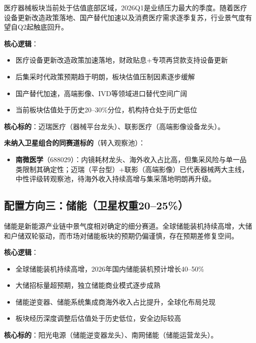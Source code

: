 医疗器械板块当前处于估值底部区域，2026Q1是业绩压力最大的季度。随着医疗设备更新改造政策落地、国产替代加速以及消费医疗需求逐季复苏，行业景气度有望自Q2起触底回升。

\textbf{核心逻辑}：
\vspace{0.2em}
\begin{itemize}[leftmargin=2em]
\item 医疗设备更新改造政策加速落地，财政贴息+专项再贷款支持设备更新
\item 后集采时代政策预期趋于明朗，板块估值压制因素逐步缓解
\item 国产替代加速，高端影像、IVD等领域进口替代空间广阔
\item 当前板块估值处于历史20--30\%分位，机构持仓处于历史低位
\end{itemize}

\textbf{核心标的}：迈瑞医疗（器械平台龙头）、联影医疗（高端影像设备龙头）。

\textbf{未纳入卫星组合的同赛道标的}（转入观察池）：
\vspace{0.2em}
\begin{itemize}[leftmargin=2em]
\item \textbf{南微医学}（688029）：内镜耗材龙头、海外收入占比高，但集采风险与单一品类限制其确定性；迈瑞（平台型）+联影（高端影像）已代表器械两大主线，中性评级转观察池，待海外收入持续高增与集采落地明朗再升级。
\end{itemize}

\subsection{配置方向三：储能（卫星权重20--25\%）}

储能是新能源产业链中景气度相对确定的细分赛道。全球储能装机持续高增，大储和户储双轮驱动，而市场对储能板块的预期仍偏谨慎，存在预期差修复空间。

\textbf{核心逻辑}：
\vspace{0.2em}
\begin{itemize}[leftmargin=2em]
\item 全球储能装机持续高增，2026年国内储能装机预计增长40--50\%
\item 大储招标量超预期，独立储能商业模式逐步成熟
\item 储能逆变器、储能系统集成商海外收入占比提升，全球化布局兑现
\item 板块经历深度调整后估值处于历史低位，安全边际较高
\end{itemize}

\textbf{核心标的}：阳光电源（储能逆变器龙头）、南网储能（储能运营龙头）。

